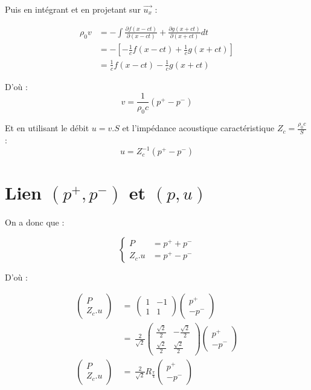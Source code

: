 \documentclass{article}
\let\oldsection\section
\renewcommand{\section}[1]{\oldsection*{#1}}
\newcommand{\pplus}{p^{+}}
\newcommand{\pmoins}{p^{-}}
\newcommand{\sqrttwoovtwo}{\frac{\sqrt{2}}{2}}
\begin{document}
Puis en intégrant et en projetant sur $\vec{u_x}$ :

\begin{align*}
	\rho_0 v 
	& = - \int \frac{\partial f(x-ct)}{\partial (x-ct)} + \frac{\partial g(x+ct)}{\partial (x+ct)} dt \\
	& = -\left[-\frac{1}{c} f(x-ct) + \frac{1}{c} g(x+ct)\right] \\
	& = \frac{1}{c} f(x-ct) - \frac{1}{c} g(x+ct) 
\end{align*}

D'où :
\begin{equation*}
	v = \frac{1}{\rho_0 c} (\pplus - \pmoins)
\end{equation*}

Et en utilisant le débit $u=v.S$ et l'impédance acoustique caractéristique $Z_c = \frac{\rho_0 c}{S}$ :
\begin{equation*}
	u = Z_c^{-1} (\pplus - \pmoins)
\end{equation*}

\section{Lien $(\pplus,\pmoins)$ et $(p,u)$}

On a donc que :

\begin{equation*}
	\begin{cases}
		P & = \pplus + \pmoins \\
		Z_c.u & = \pplus - \pmoins
	\end{cases}
\end{equation*}

D'où : 

\begin{align*}
	\begin{pmatrix}
		P\\
		Z_{c} .u
	\end{pmatrix} \ 
	& =\ 
	\begin{pmatrix}
		1 & -1\\
		1 & 1
	\end{pmatrix}
	\begin{pmatrix}
		\pplus\\
		-\pmoins
	\end{pmatrix} \\
	& =\
	\frac{2}{\sqrt{2}}
	\begin{pmatrix}
		\sqrttwoovtwo & -\sqrttwoovtwo\\
		\sqrttwoovtwo & \sqrttwoovtwo
	\end{pmatrix}
	\begin{pmatrix}
		\pplus\\
		-\pmoins
	\end{pmatrix} \\
	\begin{pmatrix}
		P\\
		Z_{c} .u
	\end{pmatrix}
	& =\
	\frac{2}{\sqrt{2}} R_{\frac{\pi}{4}}
	\begin{pmatrix}
		\pplus\\
		-\pmoins
	\end{pmatrix}
\end{align*}
\end{document}

